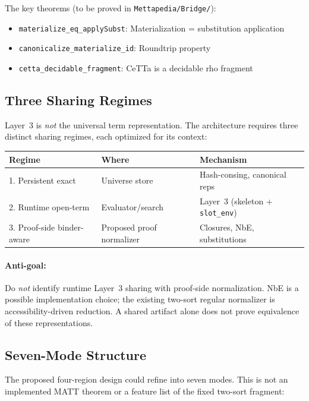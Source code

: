 \documentclass[11pt]{article}
\newcommand{\code}[1]{\texttt{#1}}
\begin{document}
The key theorems (to be proved in \code{Mettapedia/Bridge/}):
\begin{itemize}
\item \code{materialize\_eq\_applySubst}: Materialization = substitution application
\item \code{canonicalize\_materialize\_id}: Roundtrip property
\item \code{cetta\_decidable\_fragment}: CeTTa is a decidable rho fragment
\end{itemize}

\subsection{Three Sharing Regimes}

Layer~3 is \emph{not} the universal term representation.  The architecture
requires three distinct sharing regimes, each optimized for its context:

\begin{center}
\begin{tabular}{lll}
\toprule
\textbf{Regime} & \textbf{Where} & \textbf{Mechanism} \\
\midrule
1. Persistent exact & Universe store & Hash-consing, canonical reps \\
2. Runtime open-term & Evaluator/search & Layer~3 (skeleton + \code{slot\_env}) \\
3. Proof-side binder-aware & Proposed proof normalizer & Closures, NbE, substitutions \\
\bottomrule
\end{tabular}
\end{center}

\paragraph{Anti-goal:} Do \emph{not} identify runtime Layer~3 sharing with
proof-side normalization. NbE is a possible implementation choice; the
existing two-sort regular normalizer is accessibility-driven reduction.
A shared artifact alone does not prove equivalence of these representations.

\subsection{Seven-Mode Structure}

The proposed four-region design could refine into seven modes. This is not
an implemented MATT theorem or a feature list of the fixed two-sort fragment:
\end{document}
